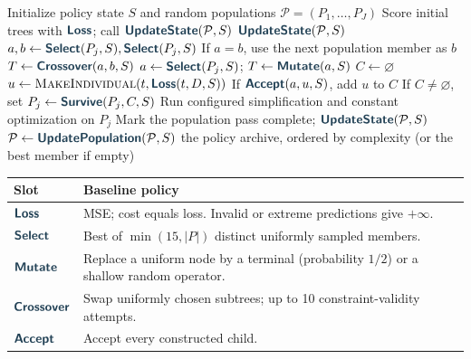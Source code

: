 \begin{algorithm}[H]
\caption{BasicSR / FullSR seed: a search engine with eight policy slots}
\label{alg:basicsr}
\begin{algorithmic}[1]
\State Initialize policy state $S$ and random populations $\mathcal P=(P_1,\ldots,P_J)$
\State Score initial trees with $\slot{Loss}$; call $\slot{UpdateState}(\mathcal P,S)$
      \State $\slot{UpdateState}(\mathcal P,S)$
          \State $a,b\gets\slot{Select}(P_j,S),\slot{Select}(P_j,S)$
          \State If $a=b$, use the next population member as $b$
          \State $T\gets\slot{Crossover}(a,b,S)$ \quad{}
        \Else
          \State $a\gets\slot{Select}(P_j,S)$; $T\gets\slot{Mutate}(a,S)$
        \EndIf
        \State $C\gets\varnothing$
          \State $u\gets\fn{MakeIndividual}(t,\slot{Loss}(t,D,S))$
          \State If $\slot{Accept}(a,u,S)$, add $u$ to $C$
        \EndFor
        \State If $C\ne\varnothing$, set $P_j\gets\slot{Survive}(P_j,C,S)$
      \EndFor
    \EndFor
    \State Run configured simplification and constant optimization on $P_j$
    \State Mark the population pass complete; $\slot{UpdateState}(\mathcal P,S)$
    \State $\mathcal P\gets\slot{UpdatePopulation}(\mathcal P,S)$
  \EndFor
\EndWhile
\State \Return the policy archive, ordered by complexity (or the best member if empty)
\end{algorithmic}
\smallskip
{\small\renewcommand{\arraystretch}{1.12}
\begin{tabularx}{\linewidth}{@{}lX@{}}
\toprule
\textbf{Slot} & \textbf{Baseline policy}\\
\midrule
$\slot{Loss}$ & MSE; cost equals loss. Invalid or extreme predictions give $+\infty$.\\
$\slot{Select}$ & Best of $\min(15,|P|)$ distinct uniformly sampled members.\\
$\slot{Mutate}$ & Replace a uniform node by a terminal (probability $1/2$) or a shallow random operator.\\
$\slot{Crossover}$ & Swap uniformly chosen subtrees; up to 10 constraint-validity attempts.\\
$\slot{Accept}$ & Accept every constructed child.\\

\end{tabularx}}
\end{algorithm}
